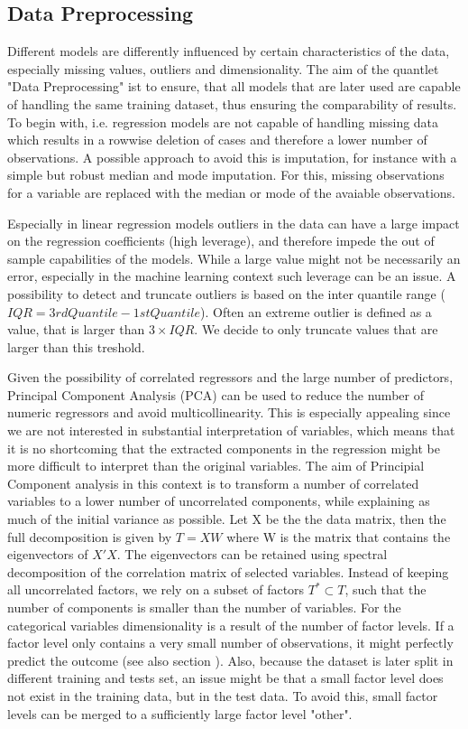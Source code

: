 \subsection{Data Preprocessing}\label{sec:data_theory}

Different models are differently influenced by certain characteristics of the data, especially missing values, outliers and dimensionality.  The aim of the quantlet "Data Preprocessing" ist to ensure, that all models that are later used are capable of handling the same training dataset, thus ensuring the comparability of results. 
To begin with, i.e. regression models are not capable of handling missing data which results in a rowwise deletion of cases and therefore a lower number of observations. A possible approach to avoid this is  imputation, for instance with a simple but robust median and mode imputation. For this, missing observations for a variable are replaced with the median or mode of the avaiable observations.

Especially in linear regression models outliers in the data can have a large impact on the regression coefficients (high leverage), and therefore impede the out of sample capabilities of the  models. While a large value might not be necessarily an error, especially in the machine learning context such leverage can be an issue. A possibility to detect and truncate outliers is based on the inter quantile range ($IQR = 3rd Quantile -1st Quantile$).
Often an extreme outlier is defined as a value, that is larger than $3 \times IQR$. We decide to only truncate values that are larger than this treshold. 

Given the possibility of correlated regressors and the large number of predictors, Principal Component Analysis (PCA) can be used to reduce the number of numeric regressors and avoid multicollinearity. This is especially appealing since we are not interested in substantial interpretation of variables, which means that it is no shortcoming that the extracted components in the regression might be more difficult to interpret than the original variables. 
The aim of Principial Component analysis in this context is to transform a number of correlated variables to a lower number of uncorrelated components, while explaining as much of the initial variance as possible. 
Let X be the the data matrix, then the full decomposition is given by 
  $  T = XW $
where W is the matrix that contains the eigenvectors of $X'X$.  
The eigenvectors can be retained using spectral decomposition of the correlation matrix of selected variables.
Instead of keeping all uncorrelated factors, we rely on a subset of factors $T^* \subset T$, such that the number of components is smaller than the number of variables. 
For the categorical variables dimensionality is a result of the number of factor levels. If a factor level only contains a very small number of observations, it might perfectly predict the outcome (see also section ). Also, because the dataset is later split in different training and tests set, an issue might be that a small factor level does not exist in the training data, but in the test data. To avoid this, small factor levels can be merged to a sufficiently large factor level "other". 